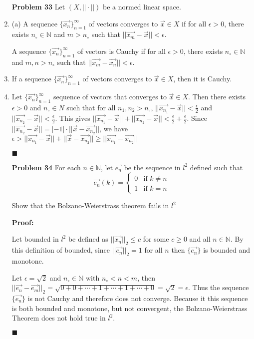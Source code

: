 \documentclass[a4paper,12pt]{report}
\newcommand{\bb}[1]{\mathbb{#1}}
\newcommand{\naught}[1]{{#1}_{\circ}}
\newcommand{\proof}[3]{
	\begin{enumerate}
		\item[\bf{Problem #1}] #2
		\item[\textbf{Proof:}]
		#3
		\begin{flushright}
			$\blacksquare$
		\end{flushright}
	\end{enumerate}
}
\newcommand{\problem}[3]{
	\begin{enumerate}
		\item[\bf{Problem #1}] #2 
		#3
	\end{enumerate}
}
\newcommand{\subproof}[3]{
	\item[#1] #2
	\item[\bf{Proof:}] 
	#3 
	\begin{flushright}
		$\blacksquare$
	\end{flushright}
}
\begin{document}
\problem{33}{
	Let $(X, ||\cdot||)$ be a normed linear space.
}{
	\item[(a)] A sequence $\{\vec{x_n}\}_{n=1}^{\infty}$ of vectors converges to $\vec{x} \in X$ if for all $\epsilon > 0$, there exists $\naught{n} \in \bb{N}$ and $m > \naught{n}$ such that $||\vec{x_m} - \vec{x}|| < \epsilon$.
	
	A sequence $\{\vec{x_n}\}_{n=1}^{\infty}$ of vectors is Cauchy if for all $\epsilon > 0$, there exists $\naught{n} \in \bb{N}$ and $m,n > \naught{n}$ such that $||\vec{x_m} - \vec{x_n}|| < \epsilon$.
	
	\subproof{(b)}{
		If a sequence $\{\vec{x_n}\}_{n=1}^{\infty}$ of vectors converges to $\vec{x} \in X$, then it is Cauchy.
	}{
		Let $\{\vec{x_n}\}_{n=1}^{\infty}$ sequence of vectors that converges to $\vec{x} \in X$. Then there exists $\epsilon > 0$ and $\naught{n} \in N$ such that for all $n_1, n_2 > \naught{n}$, $||\vec{x_{n_1}} - \vec{x}|| < \frac{\epsilon}{2}$ and $||\vec{x_{n_2}} - \vec{x}|| < \frac{\epsilon}{2}$. This gives $||\vec{x_{n_1}} - \vec{x}|| + ||\vec{x_{n_2}} - \vec{x}|| < \frac{\epsilon}{2} + \frac{\epsilon}{2}$. Since $||\vec{x_{n_2}}-\vec{x}|| = |-1| \cdot ||\vec{x}-\vec{x_{n_2}}||$, we have $\epsilon > ||\vec{x_{n_1}} - \vec{x}|| + ||\vec{x} - \vec{x_{n_2}}|| \geqslant ||\vec{x_{n_{1}}} - \vec{x_{n_{2}}}||$
	}
}

\pagebreak

\proof{34}{
	For each $n \in \bb{N}$, let $\vec{e_n}$ be the sequence in $l^2$ defined such that \\
	\begin{displaymath}
		\vec{e_n}(k) = \left\{
			\begin{array}{lr}
				0 & \text{if } k \neq n \\
				1 & \text{if } k = n
			\end{array}
		\right.
	\end{displaymath}
	
	Show that the Bolzano-Weierstrass theorem fails in $l^2$
}{
	Let bounded in $l^2$ be defined as $||\vec{x_n}||_2 \leqslant c$ for some $c \geqslant 0$ and all $n \in \bb{N}$. By this definition of bounded, since $||\vec{e_n}||_2 = 1$ for all $n$ then $\{\vec{e_n}\}$ is bounded and monotone.
	
	Let $\epsilon = \sqrt{2}$ and $\naught{n} \in \bb{N}$ with $\naught{n} < n < m$, then $||\vec{e_n} - \vec{e_m}||_2 = \sqrt{0+0+\cdots+1+\cdots+1+\cdots+0} = \sqrt{2} = \epsilon$. Thus the sequence $\{\vec{e_n}\}$ is not Cauchy and therefore does not converge. Because it this sequence is both bounded and monotone, but not convergent, the Bolzano-Weierstrass Theorem does not hold true in $l^2$.
}
\end{document}
